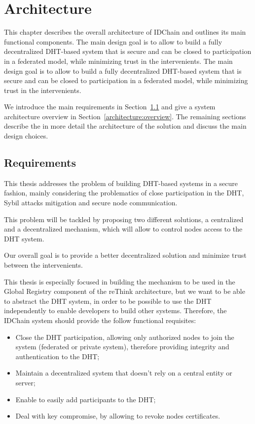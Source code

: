 \chapter{Architecture}
\label{chapter:architecture}

This chapter describes the overall architecture of IDChain and outlines its main functional components.
The main design goal is to allow to build a fully decentralized DHT-based system that is secure and can be closed to participation in a federated model, while minimizing trust in the intervenients.
The main design goal is to allow to build a fully decentralized DHT-based system that is secure and can be closed to participation in a federated model, while minimizing trust in the intervenients.

We introduce the main requirements in Section~\ref{architecture:requirements} and give a system architecture overview in Section~\ref{architecture:overview}.
The remaining sections describe the in more detail the architecture of the solution and discuss the main design choices.

\section{Requirements}\label{architecture:requirements}

This thesis addresses the problem of building DHT-based systems in a secure fashion, mainly considering the problematics of close participation in the DHT, Sybil attacks mitigation and secure node communication.

This problem will be tackled by proposing two different solutions, a centralized and a decentralized mechanism, which will allow to control nodes access to the DHT system.

Our overall goal is to provide a better decentralized solution and minimize trust between the intervenients.

This thesis is especially focused in building the mechanism to be used in the Global Registry component of the reThink architecture, but we want to be able to abstract the DHT system, in order to be possible to use the DHT independently to enable developers to build other systems.
Therefore, the IDChain system should provide the follow functional requisites:

\begin{itemize}
  \item Close the DHT participation, allowing only authorized nodes to join the system (federated or private system), therefore providing integrity and authentication to the DHT;
  \item Maintain a decentralized system that doesn't rely on a central entity or server;
  \item Enable to easily add participants to the DHT;
  \item Deal with key compromise, by allowing to revoke nodes certificates.
\end{itemize}

